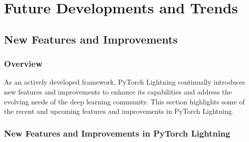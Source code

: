 \documentclass[12pt]{article}
\begin{document}
\section{Future Developments and Trends}

\subsection{New Features and Improvements}

\subsubsection{Overview}

As an actively developed framework, PyTorch Lightning continually introduces new features and improvements to enhance its capabilities and address the evolving needs of the deep learning community. This section highlights some of the recent and upcoming features and improvements in PyTorch Lightning.

\subsubsection{New Features and Improvements in PyTorch Lightning}
\end{document}
